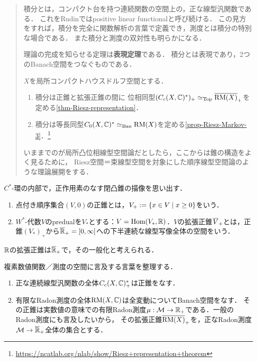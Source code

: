 \documentclass[uplatex,dvipdfmx]{jsreport}
\begin{document}
\begin{quotation}
    積分とは，コンパクト台を持つ連続関数の空間上の，正な線型汎関数である．
    これをRudinではpositive linear functionalと呼び続ける．
    この見方をすれば，積分を完全に関数解析の言葉で定義でき，測度とは積分の特別な場合である．
    また積分と測度の双対性も明らかになる．

    理論の完成を知らせる定理は\textbf{表現定理}である．
    積分とは表現であり，2つのBanach空間をつなぐものである．

    \begin{tcolorbox}[colframe=blue, colback=blue!3!,breakable,colbacktitle=ForestGreen!40!white,coltitle=black,fonttitle=\bfseries\sffamily,
    title=]
        \begin{theorem*}
            $X$を局所コンパクトハウスドルフ空間とする．
            \begin{enumerate}
                \item 積分は正錐と拡張正錐の間に
                位相同型$(C_c(X,\mathbb{C})^*)_+\simeq_{\mathrm{Top}}\overline{\mathrm{RM}(X)}_+$を定める\ref{thm-Riesz-representation}．
                \item 積分は等長同型$C_0(X,\mathbb{C})^*\simeq_{\mathrm{Ban}}\mathrm{RM}(X)$を定める\ref{prop-Riesz-Markov-3}．\footnote{\url{https://ncatlab.org/nlab/show/Riesz+representation+theorem}}
            \end{enumerate}
        \end{theorem*}
    \end{tcolorbox}
    いままでのが局所凸位相線型空間論だとしたら，ここからは錐の構造をよく見るために，
    Riesz空間＝束線型空間を対象にした順序線型空間論のような理論展開をする．
\end{quotation}

\begin{definition*}
    $C^*$-環の内部で，正作用素のなす閉凸錐の描像を思い出す．
    \begin{enumerate}
        \item 点付き順序集合$(V,0)$の正錐とは，$V_+:=\left\{x\in V\mid x\ge0\right\}$をいう．
        \item $W^*$-代数$V$のpredualを$V_*$とする：$V=\mathrm{Hom}(V_*,\mathbb{R})$．$V$の拡張正錐$\overline{V}_+$とは，正錐$(V_*)_+$から$\overline{\mathbb{R}}_+=[0,\infty]$への下半連続な線型写像全体の空間をいう．
    \end{enumerate}
    $\mathbb{R}$の拡張正錐は$\overline{\mathbb{R}}_+$で，その一般化と考えられる．
\end{definition*}

\begin{definition*}
    複素数値関数／測度の空間に言及する言葉を整理する．
    \begin{enumerate}
        \item 正な連続線型汎関数の全体$C_c(X,\mathbb{C})^*_+$は正錐をなす．
        \item 有限なRadon測度の全体$\mathrm{RM}(X,\mathbb{C})$は全変動についてBanach空間をなす．
        その正錐は実数値の意味での有限Radon測度$\mu:\mathcal{M}\to\mathbb{R}_+$である．一般のRadon測度にも言及したいから，
        その拡張正錐$\overline{\mathrm{RM}(X)}_+$を，正なRadon測度$\mathcal{M}\to\overline{\mathbb{R}}_+$全体の集合とする．
    \end{enumerate}
\end{definition*}
\end{document}
